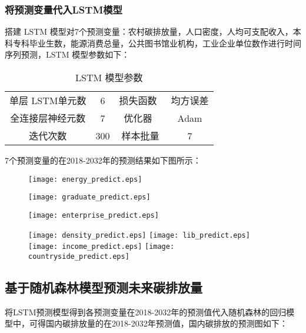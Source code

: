 \documentclass[withoutpreface,bwprint]{cumcmthesis}
\begin{document}
\subsubsection{将预测变量代入LSTM模型}
搭建 LSTM 模型对7个预测变量：农村碳排放量，人口密度，人均可支配收入，本科专科毕业生数，能源消费总量，公共图书馆业机构，工业企业单位数作进行时间序列预测，LSTM 模型参数如下：
\begin{table}[htb]
	\centering
	\caption{LSTM 模型参数}
	\begin{tabular}{cc|cc} 
		\hline
		单层 LSTM单元数 & 6   & 损失函数~ & 均方误差   \\
		全连接层神经元数   & 7   & 优化器~  & Adam  \\
		迭代次数       & 300 & 样本批量 & 7      \\
		\hline
	\end{tabular}
\end{table}

7个预测变量的在2018-2032年的预测结果如下图所示：

\begin{figure}[h]
	\begin{minipage}{0.32\linewidth}
		\centerline{\texttt{[image: energy\_predict.eps]}}
	\end{minipage}
	\begin{minipage}{0.32\linewidth}
		\centerline{\texttt{[image: graduate\_predict.eps]}}
	\end{minipage}
	\begin{minipage}{0.32\linewidth}
		\centerline{\texttt{[image: enterprise\_predict.eps]}}
	\end{minipage}
	\label{fig:images}
\end{figure}

\begin{figure}[htbp]
	\centering
	\subcaptionbox{\label{fig:图d1}}
	{\texttt{[image: density\_predict.eps]}}
	\subcaptionbox{\label{fig:图d2}}
	{\texttt{[image: lib\_predict.eps]}}
	\subcaptionbox{\label{fig:图d3}}
	{\texttt{[image: income\_predict.eps]}}
	\subcaptionbox{\label{fig:图d4}}
	{\texttt{[image: countryside\_predict.eps]}}
	\label{fig：四图}
\end{figure}

	\subsection{基于随机森林模型预测未来碳排放量}
将LSTM预测模型得到各预测变量在2018-2032年的预测值代入随机森林的回归模型中，可得国内碳排放量的在2018-2032年预测值，国内碳排放的预测图如下：
\end{document}

